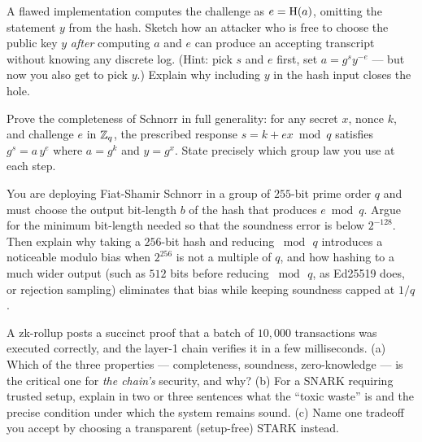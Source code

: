 \begin{exercise}
A flawed implementation computes the challenge as $e = \operatorname{H}(a)$, omitting the
statement $y$ from the hash. Sketch how an attacker who is free to choose the
public key $y$ \emph{after} computing $a$ and $e$ can produce an accepting
transcript without knowing any discrete log. (Hint: pick $s$ and $e$ first, set
$a = g^{s} y^{-e}$ --- but now you also get to pick $y$.) Explain why including
$y$ in the hash input closes the hole.
\end{exercise}

\begin{exercise}
Prove the completeness of Schnorr in full generality: for any secret $x$, nonce
$k$, and challenge $e$ in $\mathbb{Z}_q$, the prescribed response $s = k + ex \bmod q$
satisfies $g^{s} = a\,y^{e}$ where $a = g^{k}$ and $y = g^{x}$. State precisely
which group law you use at each step.
\end{exercise}

\begin{exercise}
You are deploying Fiat-Shamir Schnorr in a group of $255$-bit prime order $q$ and
must choose the output bit-length $b$ of the hash that produces $e \bmod q$.
Argue for the minimum bit-length needed so that the soundness error is below
$2^{-128}$. Then explain why taking a $256$-bit hash and reducing $\bmod\,q$
introduces a noticeable modulo bias when $2^{256}$ is not a multiple of $q$, and
how hashing to a much wider output (such as $512$ bits before reducing $\bmod\,q$,
as Ed25519 does, or rejection sampling) eliminates that bias while keeping
soundness capped at $1/q$.
\end{exercise}

\begin{exercise}
A zk-rollup posts a succinct proof that a batch of $10{,}000$ transactions was
executed correctly, and the layer-1 chain verifies it in a few milliseconds.
(a) Which of the three properties --- completeness, soundness, zero-knowledge ---
is the critical one for \emph{the chain's} security, and why? (b) For a
SNARK requiring trusted setup, explain in two or three sentences what the
``toxic waste'' is and the precise condition under which the system remains
sound. (c) Name one tradeoff you accept by choosing a transparent
(setup-free) STARK instead.
\end{exercise}
